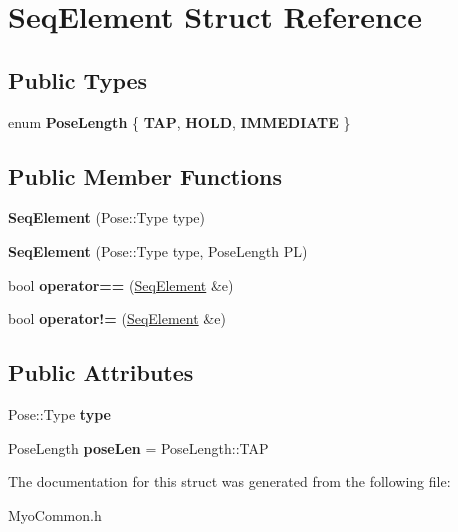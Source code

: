 \hypertarget{struct_seq_element}{\section{Seq\+Element Struct Reference}
\label{struct_seq_element}
}
\subsection*{Public Types}
\begin{DoxyCompactItemize}
\item 
\hypertarget{struct_seq_element_ac3921567c5f16b22cc77a0944f5bf330}{enum {\bfseries Pose\+Length} \{ {\bfseries T\+A\+P}, 
{\bfseries H\+O\+L\+D}, 
{\bfseries I\+M\+M\+E\+D\+I\+A\+T\+E}
 \}}\label{struct_seq_element_ac3921567c5f16b22cc77a0944f5bf330}

\end{DoxyCompactItemize}
\subsection*{Public Member Functions}
\begin{DoxyCompactItemize}
\item 
\hypertarget{struct_seq_element_ae967d4b0e39f9e0a0b0b83dac35b49fb}{{\bfseries Seq\+Element} (Pose\+::\+Type type)}\label{struct_seq_element_ae967d4b0e39f9e0a0b0b83dac35b49fb}

\item 
\hypertarget{struct_seq_element_a5bd19468f7c218fe9956dc2ee60d96a4}{{\bfseries Seq\+Element} (Pose\+::\+Type type, Pose\+Length P\+L)}\label{struct_seq_element_a5bd19468f7c218fe9956dc2ee60d96a4}

\item 
\hypertarget{struct_seq_element_a5dbbd23498ab1d1910d2c05787c4f44a}{bool {\bfseries operator==} (\hyperlink{struct_seq_element}{Seq\+Element} \&e)}\label{struct_seq_element_a5dbbd23498ab1d1910d2c05787c4f44a}

\item 
\hypertarget{struct_seq_element_a800eb0b2ad54ae37313733e8bcb15e71}{bool {\bfseries operator!=} (\hyperlink{struct_seq_element}{Seq\+Element} \&e)}\label{struct_seq_element_a800eb0b2ad54ae37313733e8bcb15e71}

\end{DoxyCompactItemize}
\subsection*{Public Attributes}
\begin{DoxyCompactItemize}
\item 
\hypertarget{struct_seq_element_a0ffe18c62f22e5bb8147bfbffd0a928a}{Pose\+::\+Type {\bfseries type}}\label{struct_seq_element_a0ffe18c62f22e5bb8147bfbffd0a928a}

\item 
\hypertarget{struct_seq_element_acffc29093e5d1452d773435890e94688}{Pose\+Length {\bfseries pose\+Len} = Pose\+Length\+::\+T\+A\+P}\label{struct_seq_element_acffc29093e5d1452d773435890e94688}

\end{DoxyCompactItemize}


The documentation for this struct was generated from the following file\+:\begin{DoxyCompactItemize}
\item 
Myo\+Common.\+h\end{DoxyCompactItemize}
